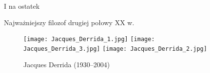 \documentclass{beamer}  %
\begin{document}
\begin{frame}{I na ostatek}

  \begin{block}{Najważniejszy filozof drugiej połowy XX w.}
    \pause
    \begin{figure}
      \centering

      \texttt{[image: Jacques\_Derrida\_1.jpg]}
      \texttt{[image: Jacques\_Derrida\_3.jpg]}
      \texttt{[image: Jacques\_Derrida\_2.jpg]}

      \caption{Jacques Derrida (1930--2004)}
    \end{figure}
  \end{block}

\end{frame}





 {}



\end{document}

